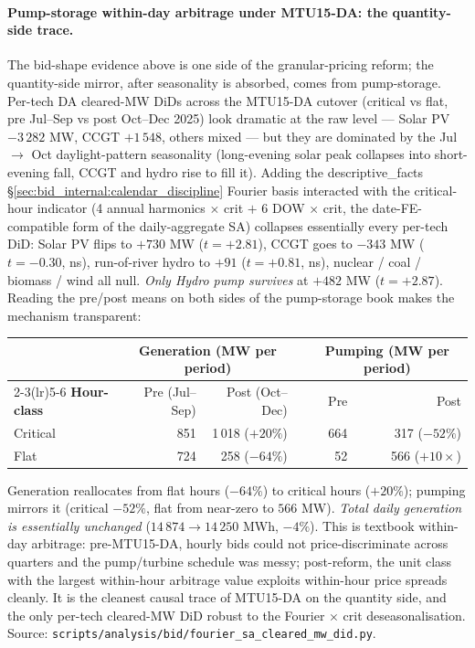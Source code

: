 \documentclass[11pt,a4paper]{article}
\begin{document}
\paragraph{Pump-storage within-day arbitrage under MTU15-DA: the quantity-side trace.} The bid-shape evidence above is one side of the granular-pricing reform; the quantity-side mirror, after seasonality is absorbed, comes from pump-storage. Per-tech DA cleared-MW DiDs across the MTU15-DA cutover (critical vs flat, pre Jul--Sep vs post Oct--Dec 2025) look dramatic at the raw level --- Solar PV $-3\,282$ MW, CCGT $+1\,548$, others mixed --- but they are dominated by the Jul $\to$ Oct daylight-pattern seasonality (long-evening solar peak collapses into short-evening fall, CCGT and hydro rise to fill it). Adding the descriptive\_facts \S\ref{sec:bid_internal:calendar_discipline} Fourier basis interacted with the critical-hour indicator (4 annual harmonics $\times$ crit $+$ 6 DOW $\times$ crit, the date-FE-compatible form of the daily-aggregate SA) collapses essentially every per-tech DiD: Solar PV flips to $+730$ MW ($t=+2.81$), CCGT goes to $-343$ MW ($t=-0.30$, ns), run-of-river hydro to $+91$ ($t=+0.81$, ns), nuclear / coal / biomass / wind all null. \emph{Only Hydro pump survives} at $+482$ MW ($t=+2.87$). Reading the pre/post means on both sides of the pump-storage book makes the mechanism transparent:

\begin{center}
\footnotesize
\setlength{\tabcolsep}{8pt}
\begin{tabular}{l r r c r r}
\toprule
& \multicolumn{2}{c}{\textbf{Generation (MW per period)}} & & \multicolumn{2}{c}{\textbf{Pumping (MW per period)}} \\
\cmidrule(lr){2-3}\cmidrule(lr){5-6}
\textbf{Hour-class} & Pre (Jul--Sep) & Post (Oct--Dec) & & Pre & Post \\
\midrule
Critical & 851 & 1\,018 ($+20\%$) & & 664 & 317 ($-52\%$) \\
Flat     & 724 & 258 ($-64\%$)    & &  52 & 566 ($+10\times$) \\
\bottomrule
\end{tabular}
\end{center}

\noindent Generation reallocates from flat hours ($-64\%$) to critical hours ($+20\%$); pumping mirrors it (critical $-52\%$, flat from near-zero to $566$ MW). \emph{Total daily generation is essentially unchanged} ($14\,874 \to 14\,250$ MWh, $-4\%$). This is textbook within-day arbitrage: pre-MTU15-DA, hourly bids could not price-discriminate across quarters and the pump/turbine schedule was messy; post-reform, the unit class with the largest within-hour arbitrage value exploits within-hour price spreads cleanly. It is the cleanest causal trace of MTU15-DA on the quantity side, and the only per-tech cleared-MW DiD robust to the Fourier $\times$ crit deseasonalisation. Source: \texttt{scripts/analysis/bid/fourier\_sa\_cleared\_mw\_did.py}.
\end{document}
